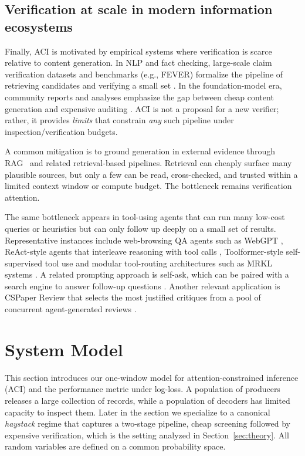 \documentclass[twocolumn]{scholar7}
\begin{document}
\subsection{Verification at scale in modern information ecosystems}

Finally, ACI is motivated by empirical systems where verification is scarce relative to content generation.
In NLP and fact checking, large-scale claim verification datasets and benchmarks (e.g., FEVER) formalize the pipeline of retrieving candidates and verifying a small set \citep{thorne2018fever}.
In the foundation-model era, community reports and analyses emphasize the gap between cheap content generation and expensive auditing \citep{bommasani2021foundation,bender2021parrots,openai2023gpt4}.
ACI is not a proposal for a new verifier; rather, it provides \emph{limits} that constrain \emph{any} such pipeline under inspection/verification budgets.

A common mitigation is to ground generation in external evidence through RAG~\cite{lewis2020rag} and related retrieval-based pipelines.
Retrieval can cheaply surface many plausible sources, but only a few can be read, cross-checked, and trusted within a limited context window or compute budget.
The bottleneck remains verification attention.

The same bottleneck appears in tool-using agents that can run many low-cost queries or heuristics but can only follow up deeply on a small set of results. Representative instances include web-browsing QA agents such as WebGPT \cite{nakano2021webgpt},
ReAct-style agents that interleave reasoning with tool calls \cite{yao2023react},
Toolformer-style self-supervised tool use \cite{schick2023toolformer}
and modular tool-routing architectures such as MRKL systems \cite{karpas2022mrkl}. A related prompting approach is self-ask, which can be paired with a search engine to answer follow-up questions \cite{press2023measuring}. Another relevant application is CSPaper Review that selects the most justified critiques from a pool of concurrent agent-generated reviews \cite{cao2025cspaper}.
\section{System Model}
\label{sec:model}

This section introduces our one-window model for attention-constrained inference (ACI) and the performance metric under log-loss.
A population of producers releases a large collection of records, while a population of decoders has limited capacity to inspect them.
Later in the section we specialize to a canonical \emph{haystack} regime that captures a two-stage pipeline, cheap screening followed by expensive verification, which is the setting analyzed in Section~\ref{sec:theory}.
All random variables are defined on a common probability space.
\end{document}
